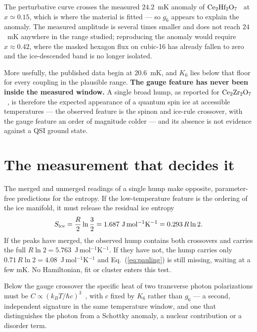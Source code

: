 \documentclass[aps,prb,preprint,amsmath,amssymb,superscriptaddress,
longbibliography,floatfix]{revtex4-2}
\begin{document}
The perturbative curve crosses the measured $24.2$~mK anomaly of
$\rm Ce_2Hf_2O_7$~\cite{Smith2025} at $x\simeq0.15$, which is where the
material is fitted --- so $g_6$ appears to explain the anomaly.  The measured
amplitude is several times smaller and does not reach $24$~mK anywhere in the
range studied; reproducing the anomaly would require $x\approx0.42$, where the
masked hexagon flux on cubic-16 has already fallen to zero and the
ice-descended band is no longer isolated.

More usefully, the published data begin at $20.6$~mK, and $K_6$ lies below that
floor for every coupling in the plausible range.  \textbf{The gauge feature has
never been inside the measured window.}  A single broad hump, as reported for
$\rm Ce_2Zr_2O_7$~\cite{Gao2019,Gaudet2019,Bhardwaj2022}, is therefore the
expected appearance of a quantum spin ice at accessible temperatures --- the
observed feature is the spinon and ice-rule crossover, with the gauge feature
an order of magnitude colder --- and its absence is not evidence against a QSI
ground state.

\section{The measurement that decides it}
\label{sec:experiment}

The merged and unmerged readings of a single hump make opposite,
parameter-free predictions for the entropy.  If the low-temperature feature is
the ordering of the ice manifold, it must release the residual ice
entropy~\cite{Pauling1935,Ramirez1999}
\begin{equation}
 S_{\rm ice}=\frac{R}{2}\ln\frac32=1.687\ \mathrm{J\,mol^{-1}K^{-1}}
 =0.293\,R\ln2 .
 \label{eq:pauling}
\end{equation}
If the peaks have merged, the observed hump contains both crossovers and
carries the full $R\ln2=5.763$~J\,mol$^{-1}$K$^{-1}$.  If they have not, the
hump carries only $0.71\,R\ln2=4.08$~J\,mol$^{-1}$K$^{-1}$ and
Eq.~(\ref{eq:pauling}) is still missing, waiting at a few mK.  No Hamiltonian,
fit or cluster enters this test.

Below the gauge crossover the specific heat of two transverse photon
polarizations must be $C\propto(k_BT/\hbar c)^3$~\cite{Benton2012}, with $c$
fixed by $K_6$ rather than $g_6$ --- a second, independent signature in the
same temperature window, and one that distinguishes the photon from a Schottky
anomaly, a nuclear contribution or a disorder term.
\end{document}
